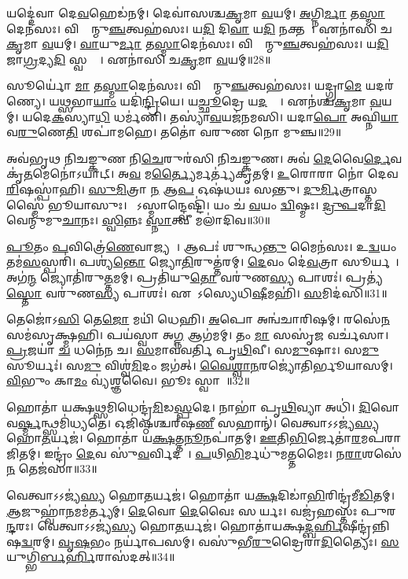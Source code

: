 𑌯𑌦𑍍𑌦𑍇॑𑌵𑌾 𑌦𑍇\ul{𑌵}𑌹𑍇𑌡॑𑌨𑌮𑍍।
𑌦𑍇𑌵𑌾॑𑌸𑌶𑍍𑌚\ul{𑌕𑍃}𑌮𑌾 \ul{𑌵}𑌯𑌮𑍍।
\ul{𑌅}𑌗𑍍𑌨𑌿\ul{𑌰𑍍𑌮𑌾} 𑌤\ul{𑌸𑍍𑌮𑌾}𑌦𑍇𑌨॑𑌸𑌃।
𑌵𑌿𑌶𑍍𑌵𑌾᳚𑌨𑍍𑌮𑍁\ul{𑌞𑍍𑌚}𑌤𑍍𑌵𑌹॑𑌸𑌃।
𑌯\ul{𑌦𑌿} 𑌦𑌿\ul{𑌵𑌾} 𑌯\ul{𑌦𑌿} 𑌨𑌕𑍍𑌤𑌮𑍍᳚।
𑌏𑌨𑌾॑𑌸𑌿 𑌚\ul{𑌕𑍃}𑌮𑌾 \ul{𑌵}𑌯𑌮𑍍।
\ul{𑌵𑌾}𑌯𑍁\ul{𑌰𑍍𑌮𑌾} 𑌤\ul{𑌸𑍍𑌮𑌾}𑌦𑍇𑌨॑𑌸𑌃।
𑌵𑌿𑌶𑍍𑌵𑌾᳚𑌨𑍍𑌮𑍁\ul{𑌞𑍍𑌚}𑌤𑍍𑌵𑌹॑𑌸𑌃।
𑌯\ul{𑌦𑌿} 𑌜𑌾\ul{𑌗𑍍𑌰}𑌦𑍍𑌯\ul{𑌦𑌿} 𑌸𑍍𑌵𑌪𑍍𑌨𑍇᳚।
𑌏𑌨𑌾॑𑌸𑌿 𑌚\ul{𑌕𑍃}𑌮𑌾 \ul{𑌵}𑌯𑌮𑍍॥28॥

𑌸𑍂𑌰𑍍𑌯𑍋॑ \ul{𑌮𑌾} 𑌤\ul{𑌸𑍍𑌮𑌾}𑌦𑍇𑌨॑𑌸𑌃।
𑌵𑌿𑌶𑍍𑌵𑌾᳚𑌨𑍍𑌮𑍁\ul{𑌞𑍍𑌚}𑌤𑍍𑌵𑌹॑𑌸𑌃।
𑌯𑌦𑍍𑌗𑍍𑌰𑌾\ul{𑌮𑍇} 𑌯𑌦𑌰॑𑌣𑍍𑌯𑍇।
𑌯\ul{𑌥𑍍𑌸}𑌭𑌾\ul{𑌯𑌾𑌂} 𑌯𑌦𑌿॑\ul{𑌨𑍍𑌦𑍍𑌰𑌿}𑌯𑍇।
𑌯\ul{𑌚𑍍𑌛𑍂}𑌦𑍍𑌰𑍇 𑌯\ul{𑌦}𑌰𑍍𑌯𑍇᳚।
𑌏𑌨॑𑌶𑍍𑌚\ul{𑌕𑍃}𑌮𑌾 \ul{𑌵}𑌯𑌮𑍍।
𑌯𑌦𑍇\ul{𑌕}𑌸𑍍𑌯𑌾\ul{𑌧𑌿} 𑌧𑌰𑍍𑌮॑𑌣𑌿।
𑌤𑌸𑍍𑌯𑌾॑\ul{𑌵}𑌯𑌜॑𑌨𑌮𑌸𑌿।
𑌯𑌦𑌾\ul{𑌪𑍋} 𑌅𑌘𑍍𑌨𑌿॑\ul{𑌯𑌾} 𑌵\ul{𑌰𑍁}𑌣𑍇\ul{𑌤𑌿} 𑌶𑌪𑌾॑𑌮𑌹𑍇।
𑌤𑌤𑍋॑ 𑌵𑌰𑍁𑌣 𑌨𑍋 𑌮𑍁𑌞𑍍𑌚॥29॥

𑌅𑌵॑𑌭𑍃𑌥 𑌨𑌿𑌚𑌙𑍍𑌕𑍁𑌣 𑌨𑌿\ul{𑌚𑍇}𑌰𑍁𑌰॑𑌸𑌿 𑌨𑌿𑌚𑌙𑍍𑌕𑍁𑌣।
𑌅𑌵॑ \ul{𑌦𑍇}𑌵𑍈\ul{𑌰𑍍𑌦𑍇}𑌵𑌕𑍃॑\ul{𑌤}𑌮𑍇𑌨𑍋॑\-𑌽𑌯𑌾𑌟𑍍।
𑌅\ul{𑌵} 𑌮\ul{𑌰𑍍𑌤𑍍𑌯𑍈}𑌰𑍍𑌮𑌰𑍍𑌤𑍍𑌯॑𑌕𑍃𑌤𑌮𑍍।
\ul{𑌉}𑌰𑍋𑌰𑌾 𑌨𑍋॑ 𑌦𑍇𑌵 \ul{𑌰𑌿}𑌷𑌸𑍍𑌪𑌾॑𑌹𑌿।
\ul{𑌸𑍁}\ul{𑌮𑌿}𑌤𑍍𑌰𑌾 \ul{𑌨} 𑌆\ul{𑌪} 𑌓𑌷॑𑌧𑌯𑌃 𑌸𑌨𑍍𑌤𑍁।
\ul{𑌦𑍁}\ul{𑌰𑍍𑌮𑌿}𑌤𑍍𑌰𑌾𑌸𑍍𑌤𑌸𑍍𑌮𑍈॑ 𑌭𑍂𑌯𑌾𑌸𑍁𑌃।
𑌯𑍋᳚𑌽𑌸𑍍𑌮𑌾𑌨𑍍𑌦𑍍𑌵𑍇𑌷𑍍𑌟𑌿॑।
𑌯𑌂 𑌚॑ \ul{𑌵}𑌯𑌂 \ul{𑌦𑍍𑌵𑌿}𑌷𑍍𑌮𑌃।
\ul{𑌦𑍍𑌰𑍁}\ul{𑌪}𑌦𑌾\ul{𑌦𑌿}𑌵𑍇𑌨𑍍𑌮𑍁॑𑌮𑍁\ul{𑌚𑌾}𑌨𑌃।
\ul{𑌸𑍍𑌵𑌿}𑌨𑍍𑌨𑌃 \ul{𑌸𑍍𑌨𑌾}𑌤𑍍𑌵𑍀 𑌮𑌲𑌾॑𑌦𑌿𑌵॥30॥

\ul{𑌪𑍂}𑌤𑌂 \ul{𑌪}𑌵𑌿𑌤𑍍𑌰𑍇॑\ul{𑌣𑍇}𑌵𑌾𑌜𑍍𑌯𑌮𑍍᳚।
𑌆𑌪𑌃॑ 𑌶𑍁𑌨𑍍𑌧\ul{𑌨𑍍𑌤𑍁} 𑌮𑍈𑌨॑𑌸𑌃।
𑌉\ul{𑌦𑍍𑌵}𑌯𑌂 𑌤𑌮॑\ul{𑌸}𑌸𑍍𑌪𑌰𑌿॑।
𑌪𑌶𑍍𑌯॑\ul{𑌨𑍍𑌤𑍋} 𑌜𑍍𑌯𑍋\ul{𑌤𑌿}𑌰𑍁𑌤𑍍𑌤॑𑌰𑌮𑍍।
\ul{𑌦𑍇}𑌵𑌂 𑌦𑍇॑\ul{𑌵}𑌤𑍍𑌰𑌾 𑌸𑍂𑌰𑍍𑌯𑌮𑍍᳚।
𑌅𑌗॑\ul{𑌨𑍍𑌮} 𑌜𑍍𑌯𑍋𑌤𑌿॑𑌰𑍁\ul{𑌤𑍍𑌤}𑌮𑌮𑍍।
𑌪𑍍𑌰𑌤𑌿॑\-𑌯𑍁\ul{𑌤𑍋} 𑌵𑌰𑍁॑𑌣\ul{𑌸𑍍𑌯} 𑌪𑌾𑌶𑌃॑।
𑌪𑍍𑌰𑌤𑍍𑌯॑\ul{𑌸𑍍𑌤𑍋} 𑌵𑌰𑍁॑𑌣\ul{𑌸𑍍𑌯} 𑌪𑌾𑌶𑌃॑।
𑌏𑌧𑍋᳚𑌽𑌸𑍍𑌯𑍇𑌧𑌿\ul{𑌷𑍀}𑌮𑌹𑌿॑।
\ul{𑌸}𑌮𑌿𑌦॑𑌸𑌿॥31॥

𑌤𑍇𑌜𑍋॑𑌽\ul{𑌸𑌿} 𑌤𑍇\ul{𑌜𑍋} 𑌮𑌯𑌿॑ 𑌧𑍇𑌹𑌿।
\ul{𑌅}𑌪𑍋 𑌅𑌨𑍍𑌵॑𑌚𑌾𑌰𑌿𑌷𑌮𑍍।
𑌰𑌸𑍇॑\ul{𑌨} 𑌸𑌮॑𑌸𑍃𑌕𑍍𑌷𑍍𑌮𑌹𑌿।
𑌪𑌯॑𑌸𑍍𑌵𑌾 𑌅\ul{𑌗𑍍𑌨} 𑌆𑌗॑𑌮𑌮𑍍।
𑌤𑌂 \ul{𑌮𑌾} 𑌸𑌸𑍃॑\ul{𑌜} 𑌵𑌰𑍍𑌚॑𑌸𑌾।
\ul{𑌪𑍍𑌰}𑌜𑌯𑌾॑ \ul{𑌚} 𑌧𑌨𑍇॑𑌨 𑌚।
\ul{𑌸}𑌮𑌾𑌵॑𑌵𑌰𑍍𑌤𑌿 𑌪𑍃\ul{𑌥𑌿}𑌵𑍀।
𑌸\ul{𑌮𑍁}𑌷𑌾𑌃।
𑌸\ul{𑌮𑍁} 𑌸𑍂𑌰𑍍𑌯𑌃॑।
𑌸\ul{𑌮𑍁} 𑌵𑌿𑌶𑍍𑌵॑\ul{𑌮𑌿}𑌦𑌂 𑌜𑌗॑𑌤𑍍।
\ul{𑌵𑍈}\ul{𑌶𑍍𑌵𑌾}\ul{𑌨}𑌰𑌜𑍍𑌯𑍋॑𑌤𑌿𑌰𑍍𑌭𑍂𑌯𑌾𑌸𑌮𑍍।
\ul{𑌵𑌿}𑌭𑍁𑌂 𑌕𑌾\ul{𑌮𑌂} 𑌵𑍍𑌯॑𑌶𑍍𑌞𑌵𑍈।
𑌭𑍂𑌃 𑌸𑍍𑌵𑌾𑌹𑌾᳚॥32॥\anuvakamend[𑌸𑍍𑌵\ul{𑌪𑍍𑌨} 𑌏𑌨𑌾\dng{ꣳ}॑𑌸𑌿 𑌚\ul{𑌕𑍃}𑌮𑌾 \ul{𑌵}𑌯𑌂 𑌮𑍁॑\ul{𑌞𑍍𑌚} 𑌮𑌲𑌾॑𑌦𑌿𑌵 \ul{𑌸}𑌮𑌿𑌦॑\ul{𑌸𑌿} 𑌜\ul{𑌗}𑌤𑍍𑌰𑍀𑌣𑌿॑ 𑌚]

𑌹𑍋𑌤𑌾॑ 𑌯𑌕𑍍𑌷\ul{𑌥𑍍𑌸}𑌮𑌿𑌧𑍇𑌨𑍍𑌦𑍍𑌰॑\ul{𑌮𑌿}𑌡\ul{𑌸𑍍𑌪}𑌦𑍇।
𑌨𑌾𑌭𑌾॑ 𑌪𑍃\ul{𑌥𑌿}𑌵𑍍𑌯𑌾 𑌅𑌧𑌿॑।
\ul{𑌦𑌿}𑌵𑍋 𑌵\ul{𑌰𑍍𑌷𑍍𑌮}𑌨𑍍𑌥𑍍𑌸𑌮𑌿॑𑌧𑍍𑌯𑌤𑍇।
𑌓𑌜𑌿॑𑌷𑍍𑌠𑌶𑍍𑌚𑌰𑍍‌\mbox{}𑌷\ul{𑌣𑍀} 𑌸𑌹𑌾𑌨𑍍॑।
𑌵𑍇𑌤𑍍𑌵𑌾𑌽𑌽𑌜𑍍𑌯॑\ul{𑌸𑍍𑌯} 𑌹𑍋\ul{𑌤}𑌰𑍍𑌯𑌜॑।
𑌹𑍋𑌤𑌾॑ 𑌯\ul{𑌕𑍍𑌷}𑌤𑍍𑌤\ul{𑌨𑍂}𑌨𑌪𑌾॑𑌤𑌮𑍍।
\ul{𑌊}𑌤𑌿\ul{𑌭𑌿}𑌰𑍍𑌜𑍇𑌤𑌾॑\ul{𑌰}𑌮𑌪॑𑌰𑌾𑌜𑌿𑌤𑌮𑍍।
𑌇𑌨𑍍𑌦𑍍𑌰𑌂॑ \ul{𑌦𑍇}𑌵 𑌸𑍁॑\ul{𑌵}𑌰𑍍𑌵𑌿𑌦𑌮𑍍᳚।
\ul{𑌪}𑌥𑌿\ul{𑌭𑌿}𑌰𑍍𑌮𑌧𑍁॑𑌮𑌤𑍍𑌤𑌮𑍈𑌃।
𑌨\ul{𑌰𑌾}𑌶𑌸𑍇॑\ul{𑌨} 𑌤𑍇𑌜॑𑌸𑌾॥33॥

𑌵𑍇𑌤𑍍𑌵𑌾𑌽𑌽𑌜𑍍𑌯॑\ul{𑌸𑍍𑌯} 𑌹𑍋\ul{𑌤}𑌰𑍍𑌯𑌜॑।
𑌹𑍋𑌤𑌾॑ 𑌯\ul{𑌕𑍍𑌷}𑌦𑌿𑌡𑌾॑\ul{𑌭𑌿}𑌰𑌿𑌨𑍍𑌦𑍍𑌰॑𑌮𑍀\ul{𑌡𑌿}𑌤𑌮𑍍।
\ul{𑌆}𑌜𑍁𑌹𑍍𑌵𑌾॑\ul{𑌨}𑌮𑌮॑𑌰𑍍𑌤𑍍𑌯𑌮𑍍।
\ul{𑌦𑍇}𑌵𑍋 \ul{𑌦𑍇}𑌵𑍈𑌃 𑌸𑌵𑍀᳚𑌰𑍍𑌯𑌃।
𑌵𑌜𑍍𑌰॑𑌹𑌸𑍍𑌤𑌃 𑌪𑍁𑌰\ul{𑌨𑍍𑌦}𑌰𑌃।
𑌵𑍇𑌤𑍍𑌵𑌾𑌽𑌽𑌜𑍍𑌯॑\ul{𑌸𑍍𑌯} 𑌹𑍋\ul{𑌤}𑌰𑍍𑌯𑌜॑।
𑌹𑍋𑌤𑌾॑𑌯𑌕𑍍𑌷\ul{𑌦𑍍𑌬}\ul{𑌰𑍍}𑌹𑌿𑌷𑍀𑌨𑍍𑌦𑍍𑌰॑𑌨𑍍𑌨𑌿𑌷\ul{𑌦𑍍𑌵}𑌰𑌮𑍍।
\ul{𑌵𑍃}\ul{𑌷}𑌭𑌂 𑌨𑌰𑍍𑌯𑌾॑𑌪𑌸𑌮𑍍।
𑌵𑌸𑍁॑𑌭𑍀\ul{𑌰𑍁}𑌦𑍍𑌰𑍈𑌰𑌾॑\ul{𑌦𑌿}𑌤𑍍𑌯𑍈𑌃।
\ul{𑌸}𑌯𑍁𑌗𑍍𑌭𑌿॑\ul{𑌰𑍍𑌬}\ul{𑌰𑍍}𑌹𑌿𑌰𑌾\-𑌸॑𑌦𑌤𑍍॥34॥

